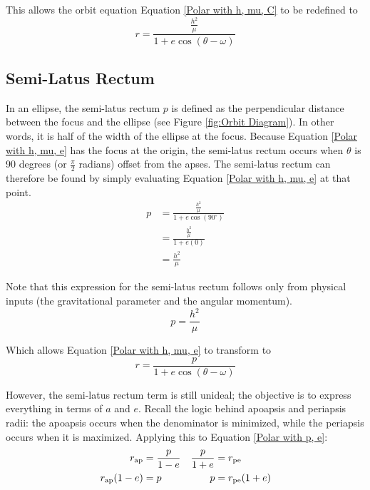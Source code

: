 \documentclass[../basicOrbitalDynamics.tex]{subfiles}
\begin{document}
This allows the orbit equation Equation \eqref{Polar with h, mu, C} to be redefined to
\begin{equation}\label{Polar with h, mu, e}
    r=\frac{\frac{h^2}{\mu}}{1+e\cos(\theta-\omega)}
\end{equation}

\subsection{Semi-Latus Rectum}

In an ellipse, the semi-latus rectum $p$ is defined as the perpendicular distance between the focus and the ellipse (see Figure \ref{fig:Orbit Diagram}). In other words, it is half of the width of the ellipse at the focus. Because Equation \eqref{Polar with h, mu, e} has the focus at the origin, the semi-latus rectum occurs when $\theta$ is 90 degrees (or $\frac{\pi}{2}$ radians) offset from the apses. The semi-latus rectum can therefore be found by simply evaluating Equation \eqref{Polar with h, mu, e} at that point.
\begin{align*}
    p & =\frac{\frac{h^2}{\mu}}{1+e\cos(90^\circ)} \\
      & =\frac{\frac{h^2}{\mu}}{1+e(0)}            \\
      & = \frac{h^2}{\mu}
\end{align*}

Note that this expression for the semi-latus rectum follows only from physical inputs (the gravitational parameter and the angular momentum).
\begin{equation}\label{SLR h and mu}
    p=\frac{h^2}{\mu}
\end{equation}

Which allows Equation \eqref{Polar with h, mu, e} to transform to
\begin{equation}\label{Polar with p, e}
    r=\frac{p}{1+e\cos(\theta-\omega)}
\end{equation}

However, the semi-latus rectum term is still unideal; the objective is to express everything in terms of $a$ and $e$. Recall the logic behind apoapsis and periapsis radii: the apoapsis occurs when the denominator is minimized, while the periapsis occurs when it is maximized. Applying this to Equation \eqref{Polar with p, e}:
\begin{align*}
    {r}_\text{ap}      & =\frac{p}{1-e} & \frac{p}{1+e} & ={r}_\text{pe}      \\
    {r}_\text{ap}(1-e) & =p             & p             & ={r}_\text{pe}(1+e) \\
\end{align*}
\end{document}
